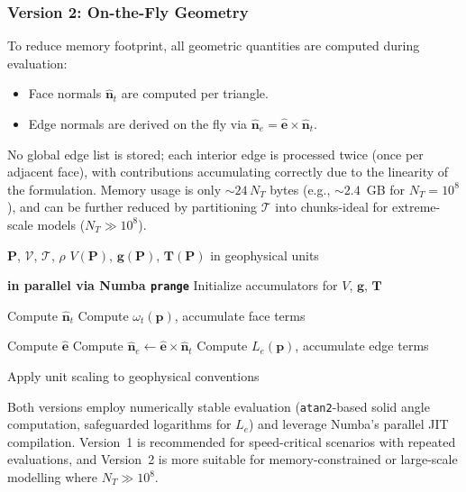 \documentclass{seg}
\begin{document}
\subsubsection*{Version 2: On-the-Fly Geometry}
To reduce memory footprint, all geometric quantities are computed during evaluation:
\begin{itemize}
    \item Face normals $\hat{\mathbf{n}}_t$ are computed per triangle.
    \item Edge normals are derived on the fly via $\hat{\mathbf{n}}_{e} = \hat{\mathbf{e}} \times \hat{\mathbf{n}}_t$.
\end{itemize}
No global edge list is stored; each interior edge is processed twice (once per adjacent face), with contributions accumulating correctly due to the linearity of the formulation. Memory usage is only $\sim\!24\,N_T$ bytes (e.g., $\sim\!2.4$~GB for $N_T = 10^8$), and can be further reduced by partitioning $\mathcal{T}$ into chunks-ideal for extreme-scale models ($N_T \gg 10^8$).

\begin{algorithm}[H]
\small
\caption{WerSch\_numba\_v2 (On-the-Fly Geometry)}
\begin{algorithmic}[1]
\Require $\mathbf{P}$, $\mathcal{V}$, $\mathcal{T}$, $\rho$
\Ensure $V(\mathbf{P})$, $\mathbf{g}(\mathbf{P})$, $\mathbf{T}(\mathbf{P})$ in geophysical units

 \textbf{in parallel via Numba \texttt{prange}}
    \State Initialize accumulators for $V$, $\mathbf{g}$, $\mathbf{T}$
    
        \State Compute $\hat{\mathbf{n}}_t$
        \State Compute $\omega_t(\mathbf{p})$, accumulate face terms
        
            \State Compute $\hat{\mathbf{e}}$
            \State Compute $\hat{\mathbf{n}}_e \gets \hat{\mathbf{e}} \times \hat{\mathbf{n}}_t$
            \State Compute $L_e(\mathbf{p})$, accumulate edge terms
        \EndFor
    \EndFor
    
    \State Apply unit scaling to geophysical conventions
\EndFor
\end{algorithmic}
\end{algorithm}

Both versions employ numerically stable evaluation (\texttt{atan2}-based solid angle computation, safeguarded logarithms for $L_e$) and leverage Numba's parallel JIT compilation. Version~1 is recommended for speed-critical scenarios with repeated evaluations, and Version~2 is more suitable for memory-constrained or large-scale modelling where $N_T \gg 10^8$.
\end{document}
